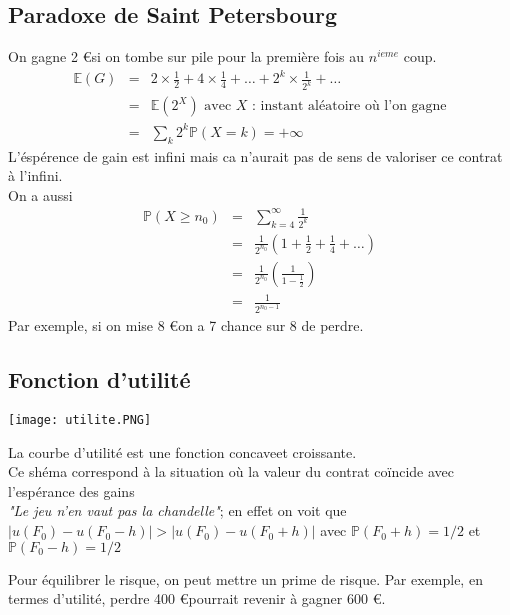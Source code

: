 \documentclass{report}
\begin{document}
\subsection{Paradoxe de Saint Petersbourg}
On gagne 2 \euro si on tombe sur pile pour la première fois au $n^{ieme}$ coup.
\begin{eqnarray}
\mathbb{E}(G)&=& 2\times \frac{1}{2}+4\times \frac{1}{4}+\dots+2^k\times \frac{1}{2^k}+\dots \nonumber\\
&=& \mathbb{E}(2^X) \mbox{      avec $X$ : instant aléatoire où l'on gagne}\nonumber \\
&=& \displaystyle\sum_k 2^k\mathbb{P}(X=k) = +\infty\nonumber 
\end{eqnarray}
L'éspérence de gain est infini mais ca n'aurait pas de sens de valoriser ce contrat à l'infini.\\
On a aussi \begin{eqnarray}
\mathbb{P}(X\geq n_0)&=& \displaystyle\sum_{k=4}^\infty \frac{1}{2^k}\nonumber \\
&=& \frac{1}{2^{n_0}}(1+\frac{1}{2}+\frac{1}{4}+\dots)\nonumber\\
&=& \frac{1}{2^{n_0}}\left(\frac{1}{1-\frac{1}{2}}\right)\nonumber\\
&=&\frac{1}{2^{n_0-1}}\nonumber
\end{eqnarray}
Par exemple, si on mise 8 \euro on a 7 chance sur 8 de perdre.

\subsection{Fonction d'utilité}
\noindent%
\begin{minipage}{.5\textwidth}%
\texttt{[image: utilite.PNG]}
\end{minipage}%
\hfill
\begin{minipage}{.55\textwidth}%
La courbe d'utilité est une fonction concave\footnotemark et croissante. \\
Ce shéma correspond à la situation où la valeur du contrat coïncide avec l'espérance des gains\\
\textit{"Le jeu n'en vaut pas la chandelle"}; en effet on voit que $|u(F_0)-u(F_0-h)|>|u(F_0)-u(F_0+h)|$ avec $\mathbb{P}(F_0+h)=1/2$ et $\mathbb{P}(F_0-h)=1/2$
\end{minipage}%
Pour équilibrer le risque, on peut mettre un prime de risque. Par exemple, en termes d'utilité, perdre 400 \euro pourrait revenir à gagner 600 \euro.
\end{document}
